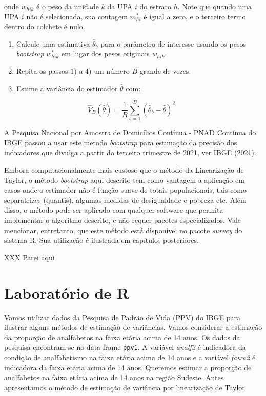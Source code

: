 \documentclass[
  12pt,
  brazilian,
]{book}
\theoremstyle{definition}
\theoremstyle{definition}
\theoremstyle{definition}
\theoremstyle{definition}
\theoremstyle{remark}
\begin{document}
onde \(w_{hik}\) é o peso da unidade \(k\) da UPA \(i\) do estrato \(h\). Note que quando uma UPA \(i\) não é selecionada, sua contagem \(m_{hi}^*\) é igual a zero, e o terceiro termo dentro do colchete é nulo.

\begin{enumerate}
\def\labelenumi{\arabic{enumi})}
\setcounter{enumi}{3}
\item
  Calcule uma estimativa \(\widehat \theta _b\) para o parâmetro de interesse usando os pesos \emph{bootstrap} \(w_{hik}^*\) em lugar dos pesos originais \(w_{hik}\).
\item
  Repita os passos 1) a 4) um número \(B\) grande de vezes.
\item
  Estime a variância do estimador \(\widehat \theta\) com:
\end{enumerate}

\begin{equation}
\widehat{V}_{B}\left( \widehat{\theta }\right) = \frac{1}{B} \sum_{b=1}^{B} \left( \widehat \theta _b - \widehat{\theta}
\right) ^{2} \,\,\, \label{eq:estpa30}
\end{equation}

A Pesquisa Nacional por Amostra de Domicílios Contínua - PNAD Contínua do IBGE passou a usar este método \emph{bootstrap} para estimação da precisão dos indicadores que divulga a partir do terceiro trimestre de 2021, ver IBGE (2021).

Embora computacionalmente mais custoso que o método da Linearização de Taylor, o método \emph{bootstrap} aqui descrito tem como vantagem a aplicação em casos onde o estimador não é função suave de totais populacionais, tais como separatrizes (quantis), algumas medidas de desigualdade e pobreza etc. Além disso, o método pode ser aplicado com qualquer software que permita implementar o algoritmo descrito, e não requer pacotes especializados. Vale mencionar, entretanto, que este método está disponível no pacote \emph{survey} do sistema R. Sua utilização é ilustrada em capítulos posteriores.

XXX Parei aqui

\hypertarget{laboratuxf3rio-de-r}{%
\section{Laboratório de R}\label{laboratuxf3rio-de-r}}

Vamos utilizar dados da Pesquisa de Padrão de Vida (PPV) do IBGE para ilustrar alguns métodos de estimação de variâncias. Vamos considerar a estimação da proporção de analfabetos na faixa etária acima de 14 anos. Os dados da pesquisa encontram-se no data frame \texttt{ppv1}. A variável \emph{analf2} é indicadora da condição
de analfabetismo na faixa etária acima de 14 anos e a variável \emph{faixa2} é indicadora da faixa etária acima de 14 anos. Queremos estimar a proporção de analfabetos na faixa etária acima de 14 anos na região Sudeste. Antes apresentamos o método de estimação de variância por linearização de Taylor
\end{document}
